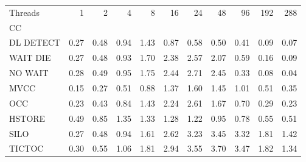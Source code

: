 \begin{tabular}{lrrrrrrrrrr}
\toprule
Threads &  1   &  2   &  4   &  8   &  16  &  24  &  48  &  96  &  192 &  288 \\
CC        &      &      &      &      &      &      &      &      &      &      \\
\midrule
DL DETECT & 0.27 & 0.48 & 0.94 & 1.43 & 0.87 & 0.58 & 0.50 & 0.41 & 0.09 & 0.07 \\
WAIT DIE  & 0.27 & 0.48 & 0.93 & 1.70 & 2.38 & 2.57 & 2.07 & 0.59 & 0.16 & 0.09 \\
NO WAIT   & 0.28 & 0.49 & 0.95 & 1.75 & 2.44 & 2.71 & 2.45 & 0.33 & 0.08 & 0.04 \\
MVCC      & 0.15 & 0.27 & 0.51 & 0.88 & 1.37 & 1.60 & 1.45 & 1.01 & 0.51 & 0.35 \\
OCC       & 0.23 & 0.43 & 0.84 & 1.43 & 2.24 & 2.61 & 1.67 & 0.70 & 0.29 & 0.23 \\
HSTORE    & 0.49 & 0.85 & 1.35 & 1.33 & 1.28 & 1.22 & 0.95 & 0.78 & 0.55 & 0.51 \\
SILO      & 0.27 & 0.48 & 0.94 & 1.61 & 2.62 & 3.23 & 3.45 & 3.32 & 1.81 & 1.42 \\
TICTOC    & 0.30 & 0.55 & 1.06 & 1.81 & 2.94 & 3.55 & 3.70 & 3.47 & 1.82 & 1.34 \\
\bottomrule
\end{tabular}
